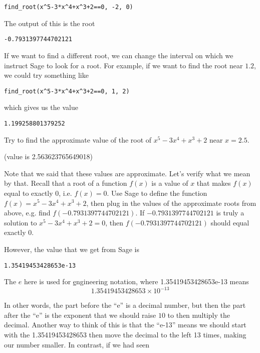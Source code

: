 \begin{verbatim}
find_root(x^5-3*x^4+x^3+2==0, -2, 0)
\end{verbatim}

The output of this is the root

\begin{verbatim}
-0.7931397744702121
\end{verbatim}

If we want to find a different root, we can change the interval on
which we instruct Sage to look for a root. For example, if we want
to find the root near $1.2$, we could try something like

\begin{verbatim}
find_root(x^5-3*x^4+x^3+2==0, 1, 2)
\end{verbatim}

which gives us the value

\begin{verbatim}
1.199258801379252
\end{verbatim}

Try to find the approximate value of the root of $x^5-3x^4+x^3+2$
near $x=2.5$.

(value is 2.563623765649018)

Note that we said that these values are approximate. Let's verify
what we mean by that. Recall that a root of a function $f(x)$ is
a value of $x$ that makes $f(x)$ equal to exactly $0$, i.e.
$f(x)=0$. Use Sage to define the function $f(x)=x^5-3x^4+x^3+2$,
then plug in the values of the approximate roots from above,
e.g. find $f(-0.7931397744702121)$. If $-0.7931397744702121$
is truly a solution to $x^5-3x^4+x^3+2=0$, then
$f(-0.7931397744702121)$ should equal exactly 0.

However, the value that we get from Sage is

\begin{verbatim}
1.35419453428653e-13
\end{verbatim}

The $e$ here is used for \underline{e}ngineering notation,
where 1.35419453428653e-13 means
\begin{equation*}
1.35419453428653\times 10^{-13}
\end{equation*}

In other words, the part before the ``e'' is a decimal number,
but then the part after the ``e'' is the exponent that we should
raise $10$ to then multiply the decimal. Another way to think of
this is that the ``e-13'' means we should start with the
1.35419453428653 then move the decimal to the left 13 times,
making our number smaller. In contrast, if we had seen

